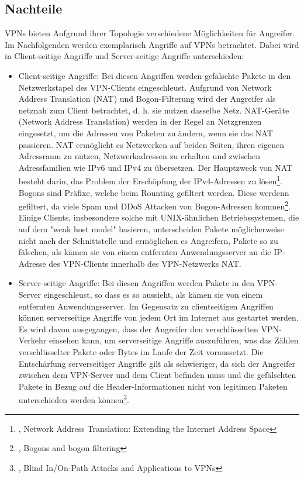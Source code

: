 \subsection{Nachteile}

VPNs bieten Aufgrund ihrer Topologie verschiedene Möglichkeiten für Angreifer. Im Nachfolgenden werden exemplarisch Angriffe auf VPNs betrachtet. Dabei wird in Client-seitige Angriffe und Server-seitige Angriffe unterschieden:

\begin{itemize}
    \item Client-seitige Angriffe: Bei diesen Angriffen werden gefälschte Pakete in den Netzwerkstapel des VPN-Clients eingeschleust. Aufgrund von Network Address Translation (NAT) und Bogon-Filterung wird der Angreifer als netznah zum Client betrachtet, d. h. sie nutzen dasselbe Netz. NAT-Geräte (Network Address Translation) werden in der Regel an Netzgrenzen eingesetzt, um die Adressen von Paketen zu ändern, wenn sie das NAT passieren. NAT ermöglicht es Netzwerken auf beiden Seiten, ihren eigenen Adressraum zu nutzen, Netzwerkadressen zu erhalten und zwischen Adressfamilien wie IPv6 und IPv4 zu übersetzen. Der Hauptzweck von NAT besteht darin, das Problem der Erschöpfung der IPv4-Adressen zu lösen\footnote{\cite{NetworkAddressTranslation}, Network Address Translation: Extending the Internet Address Space}. Bogons sind Präfixe, welche beim Rounting gefiltert werden. Diese werdenn gefiltert, da viele Spam und DDoS Attacken von Bogon-Adressen kommen\footnote{\cite{BogonFiltering}, Bogons and bogon filtering}. Einige Clients, insbesondere solche mit UNIX-ähnlichen Betriebssystemen, die auf dem "weak host model" basieren, unterscheiden Pakete möglicherweise nicht nach der Schnittstelle und ermöglichen es Angreifern, Pakete so zu fälschen, als kämen sie von einem entfernten Anwendungsserver an die IP-Adresse des VPN-Clients innerhalb des VPN-Netzwerks NAT.
    \item Server-seitige Angriffe: Bei diesen Angriffen werden Pakete in den VPN-Server eingeschleust, so dass es so aussieht, als kämen sie von einem entfernten Anwendungsserver. Im Gegensatz zu clientseitigen Angriffen können serverseitige Angriffe von jedem Ort im Internet aus gestartet werden. Es wird davon ausgegangen, dass der Angreifer den verschlüsselten VPN-Verkehr einsehen kann, um serverseitige Angriffe auszuführen, was das Zählen verschlüsselter Pakete oder Bytes im Laufe der Zeit voraussetzt. Die Entschärfung serverseitiger Angriffe gilt als schwieriger, da sich der Angreifer zwischen dem VPN-Server und dem Client befinden muss und die gefälschten Pakete in Bezug auf die Header-Informationen nicht von legitimen Paketen unterschieden werden können\footnote{\cite{AttacksOnVPNs}, Blind In/On-Path Attacks and Applications to VPNs}.
\end{itemize}
